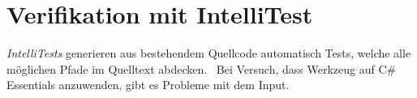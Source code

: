 %
\section{Verifikation mit IntelliTest}

\emph{IntelliTests} generieren aus bestehendem Quellcode automatisch Tests, welche alle möglichen Pfade im Quelltext abdecken.~\cite{intellitest-correctness} Bei Versuch, dass Werkzeug auf C\# Essentials anzuwenden, gibt es Probleme mit dem Input. 